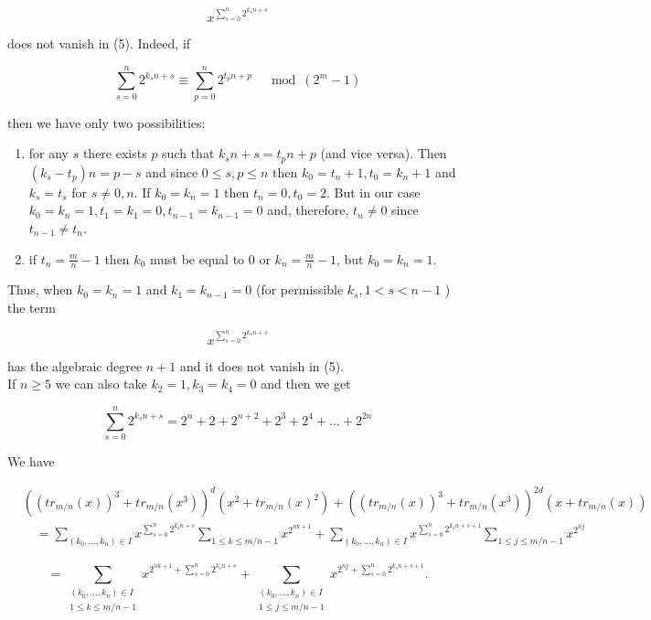 \documentclass[10pt]{article}
\begin{document}
$$
x^{\sum_{s=0}^{n} 2^{k_{s} n+s}}
$$

does not vanish in (5). Indeed, if

$$
\sum_{s=0}^{n} 2^{k_{s} n+s} \equiv \sum_{p=0}^{n} 2^{t_{p} n+p} \quad \bmod \left(2^{m}-1\right)
$$

then we have only two possibilities:

\begin{enumerate}
  \item for any $s$ there exists $p$ such that $k_{s} n+s=t_{p} n+p$ (and vice versa). Then $\left(k_{s}-t_{p}\right) n=p-s$ and since $0 \leq s, p \leq n$ then $k_{0}=t_{n}+1, t_{0}=k_{n}+1$ and $k_{s}=t_{s}$ for $s \neq 0, n$. If $k_{0}=k_{n}=1$ then $t_{n}=0, t_{0}=2$. But in our case $k_{0}=k_{n}=1, t_{1}=k_{1}=0, t_{n-1}=k_{n-1}=0$ and, therefore, $t_{n} \neq 0$ since $t_{n-1} \neq t_{n}$.
  \item if $t_{n}=\frac{m}{n}-1$ then $k_{0}$ must be equal to 0 or $k_{n}=\frac{m}{n}-1$, but $k_{0}=k_{n}=1$.
\end{enumerate}

Thus, when $k_{0}=k_{n}=1$ and $k_{1}=k_{n-1}=0$ (for permissible $k_{s}, 1<s<n-1$ ) the term

$$
x^{\sum_{s=0}^{n} 2^{k_{s} n+s}}
$$

has the algebraic degree $n+1$ and it does not vanish in (5).\\
If $n \geq 5$ we can also take $k_{2}=1, k_{3}=k_{4}=0$ and then we get


\begin{equation*}
\sum_{s=0}^{n} 2^{k_{s} n+s}=2^{n}+2+2^{n+2}+2^{3}+2^{4}+\ldots+2^{2 n} \tag{6}
\end{equation*}


We have

$$
\begin{aligned}
& \left(\left(t r_{m / n}(x)\right)^{3}+t r_{m / n}\left(x^{3}\right)\right)^{d}\left(x^{2}+t r_{m / n}(x)^{2}\right)+\left(\left(t r_{m / n}(x)\right)^{3}+t r_{m / n}\left(x^{3}\right)\right)^{2 d}\left(x+t r_{m / n}(x)\right) \\
& \quad=\sum_{\left(k_{0}, \ldots, k_{n}\right) \in I} x^{\sum_{s=0}^{n} 2^{k_{s} n+s}} \sum_{1 \leq k \leq m / n-1} x^{2^{n k+1}}+\sum_{\left(k_{0}, \ldots, k_{n}\right) \in I} x^{\sum_{s=0}^{n} 2^{k_{s} n+s+1}} \sum_{1 \leq j \leq m / n-1} x^{2^{n j}}
\end{aligned}
$$


\begin{equation*}
=\sum_{\substack{\left(k_{0}, \ldots, k_{n}\right) \in I \\ 1 \leq k \leq m / n-1}} x^{2^{n k+1}+\sum_{s=0}^{n} 2^{k_{s} n+s}}+\sum_{\substack{\left(k_{0}, \ldots, k_{n}\right) \in I \\ 1 \leq j \leq m / n-1}} x^{2^{n j}+\sum_{s=0}^{n} 2^{k_{s} n+s+1}} . \tag{7}
\end{equation*}
\end{document}
